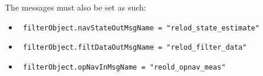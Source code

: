 The messages must also be set as such:

\begin{itemize}
\item    \texttt{    filterObject.navStateOutMsgName = "relod\_state\_estimate"}
 \item    \texttt{   filterObject.filtDataOutMsgName = "relod\_filter\_data"}
 \item    \texttt{   filterObject.opNavInMsgName = "reold\_opnav\_meas"}
\end{itemize}


